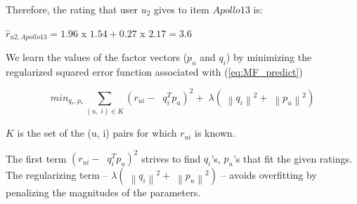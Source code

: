 \documentclass[oneside,13pt]{extreport}
\begin{document}
Therefore, the rating that user $u_2$ gives to item $Apollo 13$ is:

$\hat r_{u2 , Apollo 13} = 1.96$ x $1.54 + 0.27$ x $2.17 = 3.6$

We learn the values of the factor vectors (${p_u}$ and ${q_i}$) by minimizing the regularized squared error function associated with (\ref{eq:MF_predict})

\begin{equation}
mi{n_{{q_*},{p_*}}}\mathop \sum \limits_{\left( {u,\;i} \right) \in K} {\left( {{r_{ui}} - \;\;q_i^T{p_u}} \right)^2} + \;\lambda \left( {\;{{\left\| {{q_i}} \right\|}^2} + \;{{\left\| {{p_u}} \right\|}^2}} \right)
\label{eq: MBMF}
\end{equation}

$K$ is the set of the (u, i) pairs for which $r_{ui}$ is known. 

The first term ${\left( {{r_{ui}} - \;\;q_i^T{p_u}} \right)^2}$ strives to find $q_i$'s, $p_u$'s that fit the given ratings.
The regularizing term – $\lambda \left( {\;{{\left\| {{q_i}} \right\|}^2} + \;{{\left\| {{p_u}} \right\|}^2}}  \right)$ – avoids overfitting by penalizing the magnitudes of the parameters.
\end{document}
